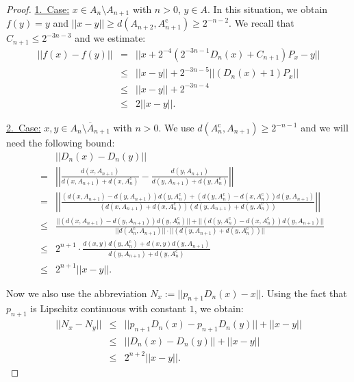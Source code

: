 \documentclass[a4paper]{amsart}
\def\cc{\mathrm c}
\theoremstyle{definition}
\begin{document}
\begin{proof}
\underline{1.\ Case:} $x \in A_n \setminus A_{n+1}$ with $n>0$, $y \in A$. In this situation, we obtain $f(y)=y$ and $||x-y||\geq d(A_{n+2}, A_{n+1}^\cc) \geq 2^{-n-2}$.
We recall that $C_{n+1}\leq 2^{-3n-3}$ and we estimate: 
\begin{eqnarray*}
||f(x) - f(y)|| & = & ||x + 2^{-4}\left (2^{-3n -1}D_{n}(x) + C_{n+1} \right) P_x - y||\\
& \leq & ||x - y|| + 2^{-3n-5}||\left (D_{n}(x) + 1 \right)P_x|| \\
& \leq & ||x - y|| + 2^{-3n-4}\\
&\leq & 2||x - y||.
\end{eqnarray*}

\underline{2.\ Case:} $x, y \in \overline{A_n \setminus A_{n+1}}$ with $n>0$. We use $d(A_n^\cc, A_{n+1})\geq2^{-n-1}$ and we will need the following bound:
\begin{eqnarray*} 
&& ||D_n(x) - D_n(y)||\\
& = & \left|\left|\frac{d(x, A_{n+1})}{d(x, A_{n+1}) + d(x, A_n^\cc)} - \frac{d(y, A_{n+1})}{d(y, A_{n+1}) + d(y, A_n^\cc)}\right|\right| \\
& = & \left|\left|\frac{\left (d(x, A_{n+1}) - d(y, A_{n+1}) \right )d(y, A_n^\cc) + \left (d(y,A_n^\cc) - d(x, A_n^\cc)\right) d(y, A_{n+1})}{\left (d(x, A_{n+1}) + d(x, A_n^\cc)\right )\left (d(y, A_{n+1}) + d(y, A_n^\cc) \right)}\right|\right| \\
& \leq & \frac{||\left (d(x, A_{n+1}) - d(y, A_{n+1}) \right )d(y, A_n^\cc)|| + ||\left (d(y,A_n^\cc) - d(x, A_n^\cc)\right) d(y, A_{n+1})||}{||d(A_n^\cc, A_{n+1})||\cdot||\left (d(y, A_{n+1}) + d(y, A_n^\cc) \right)||}\\
& \leq & 2^{n+1}\cdot  \frac{d(x,y)d(y, A_n^\cc) + d(x,y) d(y, A_{n+1})}{d(y, A_{n+1}) + d(y, A_n^\cc) } \\
& \leq & 2^{n+1}||x - y||.
\end{eqnarray*}

Now we also use the abbreviation $N_x := ||p_{n+1}D_n(x) - x||$. Using the fact that $p_{n+1}$ is Lipschitz continuous with constant $1$, we obtain:
\begin{eqnarray*} 
||N_x - N_y|| 
&\leq& ||p_{n+1}D_n(x)-p_{n+1}D_n(y)||+||x-y||\\
&\leq& ||D_n(x)-D_n(y)||+||x-y||\\
&\leq& 2^{n+2}||x-y||.
\end{eqnarray*}


\end{proof}
\end{document}
